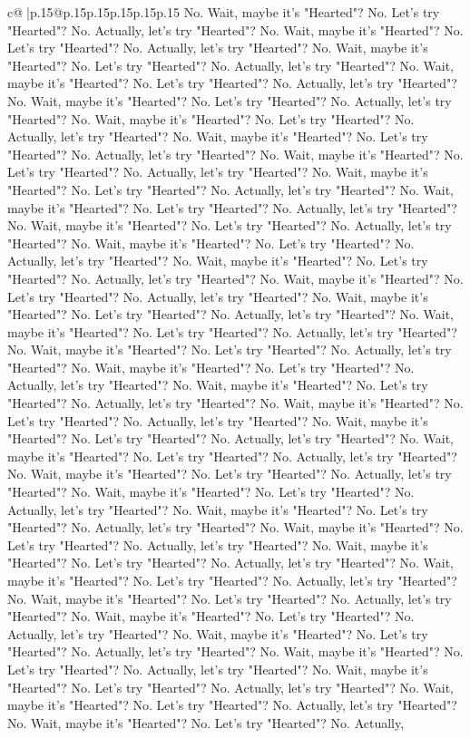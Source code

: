 \documentclass{article}
\begin{document}
{\begin{supertabular}{c@{$\;$}|p{.15\linewidth}@{}p{.15\linewidth}p{.15\linewidth}p{.15\linewidth}p{.15\linewidth}p{.15\linewidth}}
{{{No. Wait, maybe it's "Hearted"? No. Let's try "Hearted"? No. Actually, let's try "Hearted"? No. Wait, maybe it's "Hearted"? No. Let's try "Hearted"? No. Actually, let's try "Hearted"? No. Wait, maybe it's "Hearted"? No. Let's try "Hearted"? No. Actually, let's try "Hearted"? No. Wait, maybe it's "Hearted"? No. Let's try "Hearted"? No. Actually, let's try "Hearted"? No. Wait, maybe it's "Hearted"? No. Let's try "Hearted"? No. Actually, let's try "Hearted"? No. Wait, maybe it's "Hearted"? No. Let's try "Hearted"? No. Actually, let's try "Hearted"? No. Wait, maybe it's "Hearted"? No. Let's try "Hearted"? No. Actually, let's try "Hearted"? No. Wait, maybe it's "Hearted"? No. Let's try "Hearted"? No. Actually, let's try "Hearted"? No. Wait, maybe it's "Hearted"? No. Let's try "Hearted"? No. Actually, let's try "Hearted"? No. Wait, maybe it's "Hearted"? No. Let's try "Hearted"? No. Actually, let's try "Hearted"? No. Wait, maybe it's "Hearted"? No. Let's try "Hearted"? No. Actually, let's try "Hearted"? No. Wait, maybe it's "Hearted"? No. Let's try "Hearted"? No. Actually, let's try "Hearted"? No. Wait, maybe it's "Hearted"? No. Let's try "Hearted"? No. Actually, let's try "Hearted"? No. Wait, maybe it's "Hearted"? No. Let's try "Hearted"? No. Actually, let's try "Hearted"? No. Wait, maybe it's "Hearted"? No. Let's try "Hearted"? No. Actually, let's try "Hearted"? No. Wait, maybe it's "Hearted"? No. Let's try "Hearted"? No. Actually, let's try "Hearted"? No. Wait, maybe it's "Hearted"? No. Let's try "Hearted"? No. Actually, let's try "Hearted"? No. Wait, maybe it's "Hearted"? No. Let's try "Hearted"? No. Actually, let's try "Hearted"? No. Wait, maybe it's "Hearted"? No. Let's try "Hearted"? No. Actually, let's try "Hearted"? No. Wait, maybe it's "Hearted"? No. Let's try "Hearted"? No. Actually, let's try "Hearted"? No. Wait, maybe it's "Hearted"? No. Let's try "Hearted"? No. Actually, let's try "Hearted"? No. Wait, maybe it's "Hearted"? No. Let's try "Hearted"? No. Actually, let's try "Hearted"? No. Wait, maybe it's "Hearted"? No. Let's try "Hearted"? No. Actually, let's try "Hearted"? No. Wait, maybe it's "Hearted"? No. Let's try "Hearted"? No. Actually, let's try "Hearted"? No. Wait, maybe it's "Hearted"? No. Let's try "Hearted"? No. Actually, let's try "Hearted"? No. Wait, maybe it's "Hearted"? No. Let's try "Hearted"? No. Actually, let's try "Hearted"? No. Wait, maybe it's "Hearted"? No. Let's try "Hearted"? No. Actually, let's try "Hearted"? No. Wait, maybe it's "Hearted"? No. Let's try "Hearted"? No. Actually, let's try "Hearted"? No. Wait, maybe it's "Hearted"? No. Let's try "Hearted"? No. Actually, let's try "Hearted"? No. Wait, maybe it's "Hearted"? No. Let's try "Hearted"? No. Actually, let's try "Hearted"? No. Wait, maybe it's "Hearted"? No. Let's try "Hearted"? No. Actually, let's try "Hearted"? No. Wait, maybe it's "Hearted"? No. Let's try "Hearted"? No. Actually, let's try "Hearted"? No. Wait, maybe it's "Hearted"? No. Let's try "Hearted"? No. Actually, let's try "Hearted"? No. Wait, maybe it's "Hearted"? No. Let's try "Hearted"? No. Actually, let's try "Hearted"? No. Wait, maybe it's "Hearted"? No. Let's try "Hearted"? No. Actually, }}}
\end{supertabular}}
\end{document}
